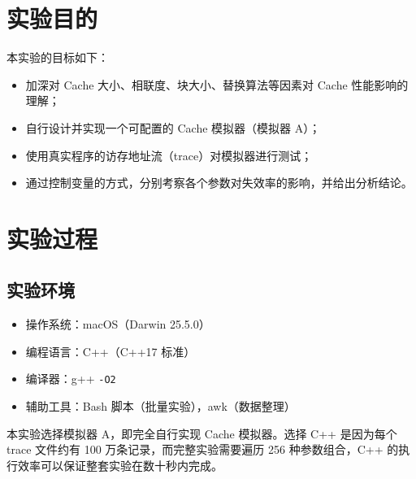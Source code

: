 \documentclass[12pt,a4paper]{ctexart}
\title{\reporttitle}
\author{\authname：\underline{李祥熙} \quad \authid：\underline{2234412799}}
\date{\today}
\begin{document}
\maketitle
\tableofcontents
\newpage

\section{实验目的}
本实验的目标如下：
\begin{itemize}
  \item 加深对 Cache 大小、相联度、块大小、替换算法等因素对 Cache 性能影响的理解；
  \item 自行设计并实现一个可配置的 Cache 模拟器（模拟器 A）；
  \item 使用真实程序的访存地址流（trace）对模拟器进行测试；
  \item 通过控制变量的方式，分别考察各个参数对失效率的影响，并给出分析结论。
\end{itemize}

\section{实验过程}
\subsection{实验环境}
\begin{itemize}
  \item 操作系统：macOS（Darwin 25.5.0）
  \item 编程语言：C++（C++17 标准）
  \item 编译器：g++ \texttt{-O2}
  \item 辅助工具：Bash 脚本（批量实验），awk（数据整理）
\end{itemize}
本实验选择模拟器 A，即完全自行实现 Cache 模拟器。选择 C++ 是因为每个 trace 文件约有
100 万条记录，而完整实验需要遍历 256 种参数组合，C++ 的执行效率可以保证整套实验在数十秒内完成。
\end{document}
